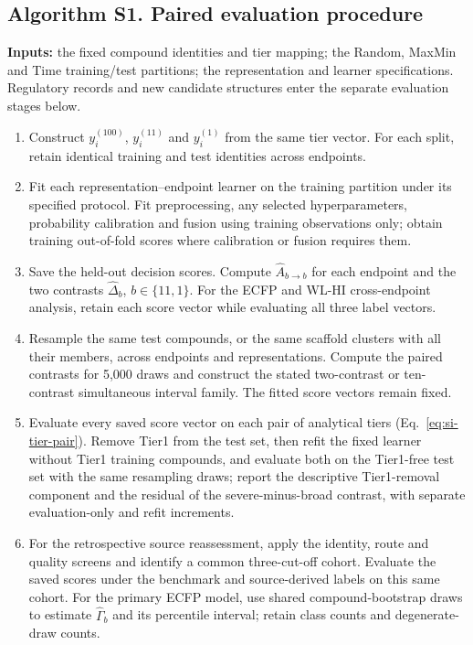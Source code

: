 \subsection*{Algorithm S1. Paired evaluation procedure}
\textbf{Inputs:} the fixed compound identities and tier mapping; the Random, MaxMin and Time training/test partitions; the representation and learner specifications. Regulatory records and new candidate structures enter the separate evaluation stages below.
\begin{enumerate}
\item Construct \(y_i^{(100)}\), \(y_i^{(11)}\) and \(y_i^{(1)}\) from the same tier vector. For each split, retain identical training and test identities across endpoints.
\item Fit each representation--endpoint learner on the training partition under its specified protocol. Fit preprocessing, any selected hyperparameters, probability calibration and fusion using training observations only; obtain training out-of-fold scores where calibration or fusion requires them.
\item Save the held-out decision scores. Compute \(\widehat A_{b\to b}\) for each endpoint and the two contrasts \(\widehat\Delta_b\), \(b\in\{11,1\}\). For the ECFP and WL-HI cross-endpoint analysis, retain each score vector while evaluating all three label vectors.
\item Resample the same test compounds, or the same scaffold clusters with all their members, across endpoints and representations. Compute the paired contrasts for 5,000 draws and construct the stated two-contrast or ten-contrast simultaneous interval family. The fitted score vectors remain fixed.
\item Evaluate every saved score vector on each pair of analytical tiers (Eq.~\eqref{eq:si-tier-pair}). Remove Tier1 from the test set, then refit the fixed learner without Tier1 training compounds, and evaluate both on the Tier1-free test set with the same resampling draws; report the descriptive Tier1-removal component and the residual of the severe-minus-broad contrast, with separate evaluation-only and refit increments.
\item For the retrospective source reassessment, apply the identity, route and quality screens and identify a common three-cut-off cohort. Evaluate the saved scores under the benchmark and source-derived labels on this same cohort. For the primary ECFP model, use shared compound-bootstrap draws to estimate \(\widehat\Gamma_b\) and its percentile interval; retain class counts and degenerate-draw counts.

\end{enumerate}
